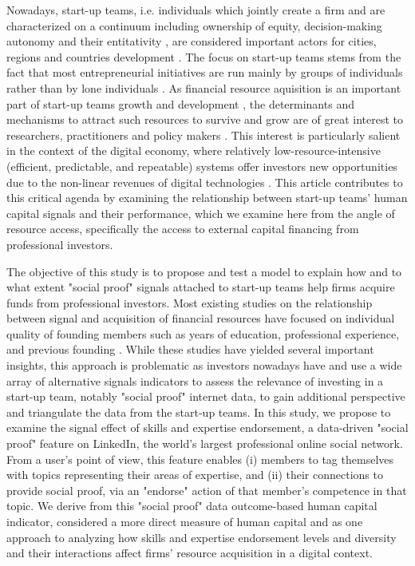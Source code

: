 \documentclass[12pt]{article}
\begin{document}
Nowadays, start-up teams, i.e. individuals which jointly create a firm and are characterized on a continuum including ownership of equity, decision-making autonomy and their entitativity \citep{kamm1990entrepreneurial, knight2020start}, are considered important actors for cities, regions and countries development \citep{audretsch2001linking, autio2016entrepreneurship}. The focus on start-up teams stems from the fact that most entrepreneurial initiatives are run mainly by groups of individuals rather than by lone individuals \citep{klotz2014new}. As financial resource aquisition is an important part of start-up teams growth and development \citep{rosenbusch2013does}, the determinants and mechanisms to attract such resources to survive and grow are of great interest to researchers, practitioners and policy makers \citep{EUcommission2015digital}. This interest is particularly salient in the context of the digital economy, where relatively low-resource-intensive (efficient, predictable, and repeatable) systems offer investors new opportunities due to the non-linear revenues of digital technologies \citep{nambisan2017digital, sahut2021age}. This article contributes to this critical agenda by examining the relationship between start-up teams' human capital signals and their performance, which we examine here from the angle of resource access, specifically the access to external capital financing from professional investors.

The objective of this study is to propose and test a model to explain how and to what extent "social proof" signals attached to start-up teams help firms acquire funds from professional investors. Most existing studies on the relationship between signal and acquisition of financial resources have focused on individual quality of founding members such as years of education, professional experience, and previous founding \citep{shane2002network, hsu2007experienced}. While these studies have yielded several important insights, this approach is problematic as investors nowadays have and use a wide array of alternative signals indicators to assess the relevance of investing in a start-up team, notably "social proof" internet data, to gain additional perspective and triangulate the data from the start-up teams. In this study, we propose to examine the signal effect of skills and expertise endorsement, a data-driven "social proof" feature on LinkedIn, the world's largest professional online social network. From a user's point of view, this feature enables (i) members to tag themselves with topics representing their areas of expertise, and (ii) their connections to provide social proof, via an "endorse" action of that member's competence in that topic. We derive from this "social proof" data outcome-based human capital indicator, considered a more direct measure of human capital \citep{marvel2016human} and as one approach to analyzing how skills and expertise endorsement levels and diversity and their interactions affect firms' resource acquisition in a digital context.
\end{document}
